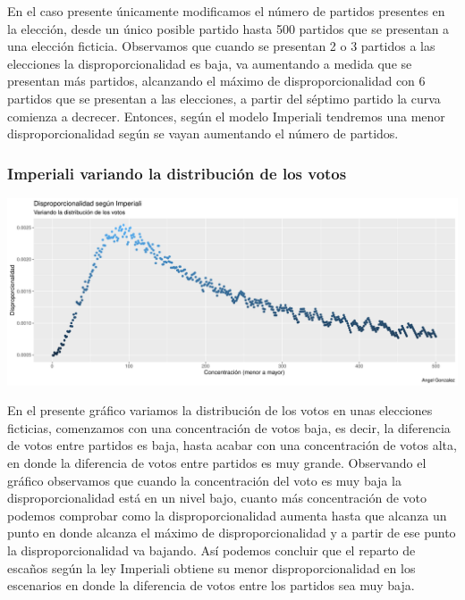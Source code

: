 \documentclass[12pt,a4paper,]{book}
\numberwithin{dummy}{section}
\theoremstyle{ocrenumbox}
\theoremstyle{blacknumex}
\theoremstyle{blacknumbox}
\theoremstyle{ocrenum}
\theoremstyle{ocrenum}
\begin{document}
En el caso presente únicamente modificamos el número de partidos
presentes en la elección, desde un único posible partido hasta 500
partidos que se presentan a una elección ficticia. Observamos que cuando
se presentan 2 o 3 partidos a las elecciones la disproporcionalidad es
baja, va aumentando a medida que se presentan más partidos, alcanzando
el máximo de disproporcionalidad con 6 partidos que se presentan a las
elecciones, a partir del séptimo partido la curva comienza a decrecer.
Entonces, según el modelo Imperiali tendremos una menor
disproporcionalidad según se vayan aumentando el número de partidos.

\hypertarget{imperiali-variando-la-distribuciuxf3n-de-los-votos}{%
\subsubsection{Imperiali variando la distribución de los
votos}\label{imperiali-variando-la-distribuciuxf3n-de-los-votos}}

\begin{center}\includegraphics[width=0.95\linewidth]{figurasR/unnamed-chunk-26-1} \end{center}

En el presente gráfico variamos la distribución de los votos en unas
elecciones ficticias, comenzamos con una concentración de votos baja, es
decir, la diferencia de votos entre partidos es baja, hasta acabar con
una concentración de votos alta, en donde la diferencia de votos entre
partidos es muy grande. Observando el gráfico observamos que cuando la
concentración del voto es muy baja la disproporcionalidad está en un
nivel bajo, cuanto más concentración de voto podemos comprobar como la
disproporcionalidad aumenta hasta que alcanza un punto en donde alcanza
el máximo de disproporcionalidad y a partir de ese punto la
disproporcionalidad va bajando. Así podemos concluir que el reparto de
escaños según la ley Imperiali obtiene su menor disproporcionalidad en
los escenarios en donde la diferencia de votos entre los partidos sea
muy baja.
\end{document}
